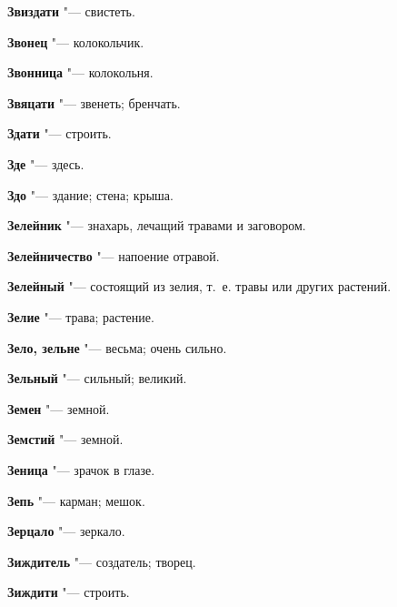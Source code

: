 \begin{mymulticols}{2}
\noindent\textbf{Звиздати} "--- свистеть. 




\noindent\textbf{Звонец} "--- колокольчик. 




\noindent\textbf{Звонница} "--- колокольня. 




\noindent\textbf{Звяцати} "--- звенеть; бренчать. 




\noindent\textbf{Здати} "--- строить. 




\noindent\textbf{Зде} "--- здесь. 




\noindent\textbf{Здо} "--- здание; стена; крыша. 




\noindent\textbf{Зелейник} "--- знахарь, лечащий травами и заговором. 




\noindent\textbf{Зелейничество} "--- напоение отравой. 




\noindent\textbf{Зелейный} "--- состоящий из зелия, т.~е. травы или других растений. 




\noindent\textbf{Зелие} "--- трава; растение. 




\noindent\textbf{Зело, зельне} "--- весьма; очень сильно. 




\noindent\textbf{Зельный} "--- сильный; великий. 




\noindent\textbf{Земен} "--- земной. 




\noindent\textbf{Земстий} "--- земной. 




\noindent\textbf{Зеница} "--- зрачок в глазе. 




\noindent\textbf{Зепь} "--- карман; мешок. 




\noindent\textbf{Зерцало} "--- зеркало. 




\noindent\textbf{Зиждитель} "--- создатель; творец. 




\noindent\textbf{Зиждити} "--- строить. 





\end{mymulticols}
